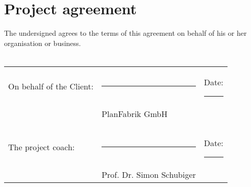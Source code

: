 \chapter{Project agreement}
\vspace{1cm} 

\noindent The undersigned agrees to the terms of this agreement on behalf of his or
her organisation or business.\\\\

\vspace{5cm} 

\noindent \begin{tabular}{l l l}
On behalf of the Client: & \rule{6cm}{.2pt} & Date: \rule{2.4cm}{.2pt}\\
                         & PlanFabrik GmbH      & \\\\\\
The project coach:          & \rule{6cm}{.2pt} & Date: \rule{2.4cm}{.2pt}\\
                         & Prof. Dr. Simon Schubiger      & \\
\end{tabular}
